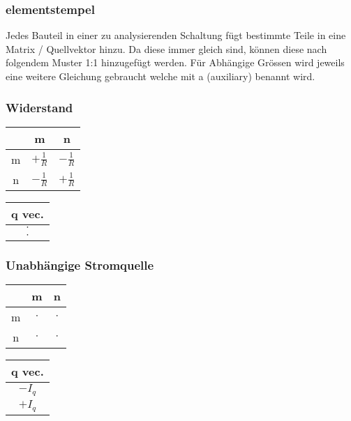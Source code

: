 \subsubsection{elementstempel}

Jedes Bauteil in einer zu analysierenden Schaltung fügt bestimmte Teile in eine Matrix / Quellvektor hinzu. 
Da diese immer gleich sind, können diese nach folgendem Muster 1:1 hinzugefügt werden. 
Für Abhängige Grössen wird jeweils eine weitere Gleichung gebraucht welche mit a (auxiliary) benannt wird.  

\begin{multicols*}{2}

    \subsubsection{Widerstand}

    \begin{center}

        

        \begin{tabular}{c|c|c}
            & m & n \\\hline
            m & $+ \frac{1}{R}$ & $- \frac{1}{R}$\\\hline
            n & $- \frac{1}{R}$ & $+ \frac{1}{R}$\\
        \end{tabular}
        \begin{tabular}{|c|}
            q vec.\\\hline
            $\cdot$\\\hline
            $\cdot$\\
        \end{tabular}
    \end{center}

   \subsubsection{Unabhängige Stromquelle}

   \begin{center}

        

        \begin{tabular}{c|c|c}
           & m & n \\\hline
            m & $\cdot$ & $\cdot$\\\hline
            n & $\cdot$ & $\cdot$\\
        \end{tabular}
        \begin{tabular}{|c|}
            q vec.\\\hline
            $-I_q$\\\hline
            $+I_q$\\
        \end{tabular}   
    \end{center}


\end{multicols*}
